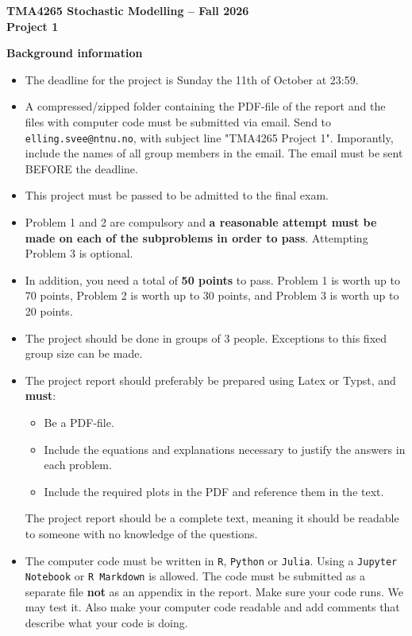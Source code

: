 \documentclass[1p]{article}		%
\title{}
\author{}
\begin{document}
\begin{center}\textbf{
{\huge{TMA4265 Stochastic Modelling -- Fall 2026}}\\ \vspace{3mm}
{\LARGE{	Project 1}}}\end{center}
\vspace{5mm}
{\LARGE \textbf{Background information}}\\
\begin{itemize}
  \item
    The deadline for the project is Sunday the 11th of October at 23:59.
  \item
    A compressed/zipped folder containing the PDF-file of the report and the files with computer code must be submitted via email. Send to \texttt{elling.svee@ntnu.no}, with subject line "TMA4265 Project 1". Imporantly, include the names of all group members in the email. The email must be sent BEFORE the deadline.
  \item
    This project must be passed to be admitted to the final exam. 
    \item Problem 1 and 2 are compulsory and \textbf{a reasonable attempt must be made on each of the subproblems in order to pass}. Attempting Problem 3 is optional.
    \item In addition, you need a total of \textbf{50 points} to pass. Problem 1 is worth up to 70 points, Problem 2 is worth up to 30 points, and Problem 3 is worth up to 20 points.
  \item
    The project should be done in groups of 3 people. Exceptions to this fixed group size can be made.
  \item
    The project report should preferably be prepared using Latex or Typst, and \textbf{must}:
    \begin{itemize} 
      \item
        Be a PDF-file.
      \item
        Include the equations and explanations necessary to justify the answers in each problem.
      \item 
        Include the required plots in the PDF and reference them in the text.
    \end{itemize}
    The project report should be a complete text, meaning it should be readable to someone with no knowledge of the questions. 
  \item
    The computer code must be written in \texttt{R}, \texttt{Python} or \texttt{Julia}. Using a \texttt{Jupyter Notebook} or \texttt{R Markdown} is allowed. The code must be submitted as a separate file \textbf{not} as an appendix in the report. Make sure your code runs. We may test it. Also make your computer code readable and add comments that describe what your code is doing.

\end{itemize}
\end{document}
